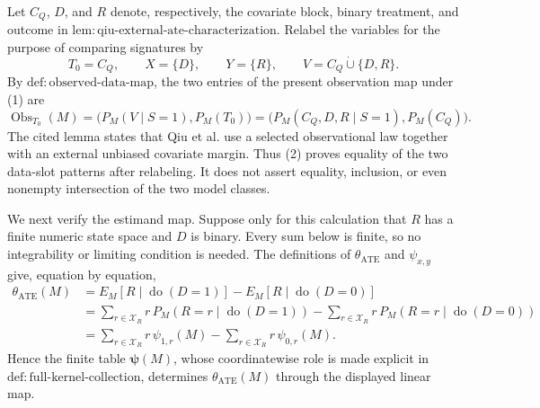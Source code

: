 Let \(C_Q\), \(D\), and \(R\) denote, respectively, the covariate block, binary treatment, and outcome in \(\mathrm{lem:qiu\text{-}external\text{-}ate\text{-}characterization}\).  Relabel the variables for the purpose of comparing signatures by
\[
T_0=C_Q,\qquad X=\{D\},\qquad Y=\{R\},\qquad
V=C_Q\mathbin{\dot\cup}\{D,R\}.
\tag{1}
\]
By \(\mathrm{def:observed\text{-}data\text{-}map}\), the two entries of the present observation map under (1) are
\[
\operatorname{Obs}_{T_0}(M)
=\bigl(P_M(V\mid S=1),P_M(T_0)\bigr)
=\bigl(P_M(C_Q,D,R\mid S=1),P_M(C_Q)\bigr).
\tag{2}
\]
The cited lemma states that Qiu et al. use a selected observational law together with an external unbiased covariate margin.  Thus (2) proves equality of the two data-slot patterns after relabeling.  It does not assert equality, inclusion, or even nonempty intersection of the two model classes.

We next verify the estimand map.  Suppose only for this calculation that \(R\) has a finite numeric state space and \(D\) is binary.  Every sum below is finite, so no integrability or limiting condition is needed.  The definitions of \(\theta_{\mathrm{ATE}}\) and \(\psi_{x,y}\) give, equation by equation,
\[
\begin{aligned}
\theta_{\mathrm{ATE}}(M)
&=E_M[R\mid\operatorname{do}(D=1)]
  -E_M[R\mid\operatorname{do}(D=0)]\\
&=\sum_{r\in\mathcal X_R}r\,
  P_M(R=r\mid\operatorname{do}(D=1))
  -\sum_{r\in\mathcal X_R}r\,
  P_M(R=r\mid\operatorname{do}(D=0))\\
&=\sum_{r\in\mathcal X_R}r\,\psi_{1,r}(M)
  -\sum_{r\in\mathcal X_R}r\,\psi_{0,r}(M).
\end{aligned}
\tag{3}
\]
Hence the finite table \(\boldsymbol\psi(M)\), whose coordinatewise role is made explicit in \(\mathrm{def:full\text{-}kernel\text{-}collection}\), determines \(\theta_{\mathrm{ATE}}(M)\) through the displayed linear map.

